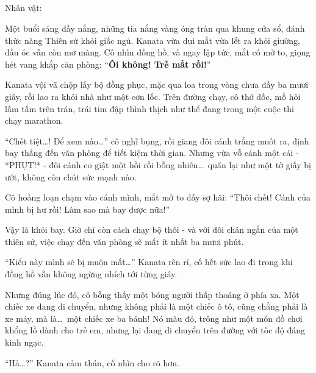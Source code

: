 \documentclass[../main.tex]{subfiles}
\begin{document}
\newpage

\subsection*{\label{ep-S16.V}}
\vspace{-4pt}
\begin{center}
    {\caviar\fontsize{12pt}{12pt}\selectfont Nhân vật:   }
\end{center}

\pov{-}

Một buổi sáng đầy nắng, những tia nắng vàng óng tràn qua khung cửa sổ, đánh thức nàng Thiên sứ khỏi giấc ngủ. Kanata vừa dụi mắt vừa lết ra khỏi giường, đầu óc vẫn còn mơ màng. Cô nhìn đồng hồ, và ngay lập tức, mắt cô mở to, giọng hét vang khắp căn phòng: ``\textbf{Ôi không! Trễ mất rồi!}''

Kanata vội vã chộp lấy bộ đồng phục, mặc qua loa trong vòng chưa đầy ba mươi giây, rồi lao ra khỏi nhà như một cơn lốc. Trên đường chạy, cô thở dốc, mồ hôi lấm tấm trên trán, trái tim đập thình thịch như thể đang trong một cuộc thi chạy marathon.

``Chết tiệt\dots! Để xem nào\dots'' cô nghĩ bụng, rồi giang đôi cánh trắng muốt ra, định bay thẳng đến văn phòng để tiết kiệm thời gian. Nhưng vừa vỗ cánh một cái - *PHỤT!* - đôi cánh co giật một hồi rồi bỗng nhiên\dots\ quăn lại như một tờ giấy bị ướt, không còn chút sức mạnh nào.

Cô hoảng loạn chạm vào cánh mình, mắt mở to đầy sợ hãi: ``Thôi chết! Cánh của mình bị hư rồi! Làm sao mà bay được nữa!''


Vậy là khỏi bay. Giờ chỉ còn cách chạy bộ thôi - và với đôi chân ngắn của một thiên sứ, việc chạy đến văn phòng sẽ mất ít nhất ba mươi phút.

``Kiểu này mình sẽ bị muộn mất\dots'' Kanata rên rỉ, cố hết sức lao đi trong khi đồng hồ vẫn không ngừng nhích tới từng giây.

Nhưng đúng lúc đó, cô bỗng thấy một bóng người thấp thoáng ở phía xa. Một chiếc xe đang di chuyển, nhưng không phải là một chiếc ô tô, cũng chẳng phải là xe máy, mà là\dots\ một chiếc xe ba bánh! Nó màu đỏ, trông như một món đồ chơi khổng lồ dành cho trẻ em, nhưng lại đang di chuyển trên đường với tốc độ đáng kinh ngạc.

``Hả\dots?'' Kanata cảm thán, cố nhìn cho rõ hơn.
\end{document}
